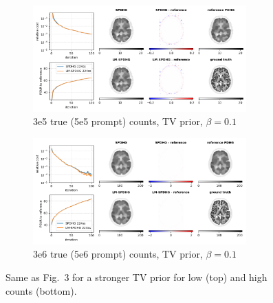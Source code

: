 \documentclass[10pt,twocolumn,twoside]{article}
\begin{document}
\begin{figure}
  \centering
  \begin{subfigure}[]{1.0\textwidth}
    \centering
    \includegraphics[width=0.9\textwidth]{./figs/brain2d_counts_3.0E+05_seed_1_beta_1.0E-01_prior_TV_niter_ref_20000_fwhm_4.5_4.5_niter_100.png}
    \caption{3e5 true (5e5 prompt) counts, TV prior, $\beta = 0.1$}
  \end{subfigure}
  \vfill
  \begin{subfigure}[]{1.0\textwidth}
    \centering
    \includegraphics[width=0.9\textwidth]{./figs/brain2d_counts_3.0E+06_seed_1_beta_1.0E-01_prior_TV_niter_ref_20000_fwhm_4.5_4.5_niter_100.png}
    \caption{3e6 true (5e6 prompt) counts, TV prior, $\beta = 0.1$}
  \end{subfigure}
  \caption{Same as Fig.~3 for a stronger TV prior for low (top) and high counts (bottom).}
\end{figure}
\end{document}
